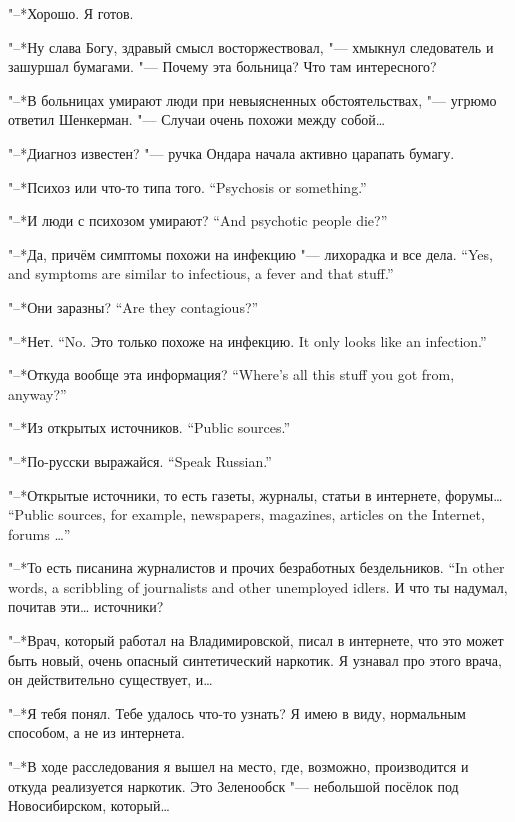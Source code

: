 "--*Хорошо.
Я готов.

"--*Ну слава Богу, здравый смысл восторжествовал, "--- хмыкнул следователь и зашуршал бумагами.
"--- Почему эта больница?
Что там интересного?

"--*В больницах умирают люди при невыясненных обстоятельствах, "--- угрюмо ответил Шенкерман.
"--- Случаи очень похожи между собой\ldots{}

"--*Диагноз известен? "--- ручка Ондара начала активно царапать бумагу.

{"--*Психоз или что-то типа того.}
{``Psychosis or something.''}

{"--*И люди с психозом умирают?}
{``And psychotic people die?''}

{"--*Да, причём симптомы похожи на инфекцию "--- лихорадка и все дела.}
{``Yes, and symptoms are similar to infectious, a fever and that stuff.''}

{"--*Они заразны?}
{``Are they contagious?''}

{"--*Нет.}
{``No.}
{Это только похоже на инфекцию.}
{It only looks like an infection.''}

{"--*Откуда вообще эта информация?}
{``Where's all this stuff you got from, anyway?''}

{"--*Из открытых источников.}
{``Public sources.''}

{"--*По-русски выражайся.}
{``Speak Russian.''}

{"--*Открытые источники, то есть газеты, журналы, статьи в интернете, форумы\ldots{}}
{``Public sources, for example, newspapers, magazines, articles on the Internet, forums \ldots{}''}

{"--*То есть писанина журналистов и прочих безработных бездельников.}
{``In other words, a scribbling of journalists and other unemployed idlers.}
И что ты надумал, почитав эти\ldots{} источники?

"--*Врач, который работал на Владимировской, писал в интернете, что это может быть новый, очень опасный синтетический наркотик.
Я узнавал про этого врача, он действительно существует, и\ldots{}

"--*Я тебя понял.
Тебе удалось что-то узнать?
Я имею в виду, нормальным способом, а не из интернета.

"--*В ходе расследования я вышел на место, где, возможно, производится и откуда реализуется наркотик.
Это Зеленообск "--- небольшой посёлок под Новосибирском, который\ldots{}

